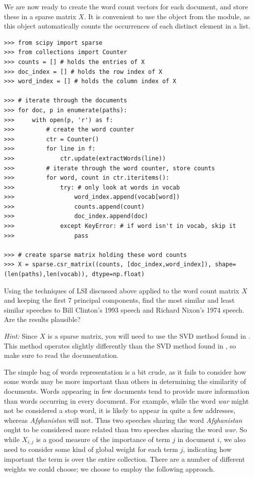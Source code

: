 We are now ready to create the word count vectors for each document, and store these in a sparse matrix $X$.
It is convenient to use the  object from the  module, as this
object automatically counts the occurrences of each distinct element in a list. 
\begin{lstlisting}
>>> from scipy import sparse
>>> from collections import Counter
>>> counts = [] # holds the entries of X
>>> doc_index = [] # holds the row index of X
>>> word_index = [] # holds the column index of X

>>> # iterate through the documents
>>> for doc, p in enumerate(paths):
>>>     with open(p, 'r') as f:
>>>         # create the word counter
>>>         ctr = Counter()
>>>         for line in f:
>>>             ctr.update(extractWords(line))
>>>         # iterate through the word counter, store counts
>>>         for word, count in ctr.iteritems():
>>>             try: # only look at words in vocab
>>>                 word_index.append(vocab[word])
>>>                 counts.append(count)
>>>                 doc_index.append(doc)
>>>             except KeyError: # if word isn't in vocab, skip it
>>>                 pass

>>> # create sparse matrix holding these word counts
>>> X = sparse.csr_matrix((counts, [doc_index,word_index]), shape=(len(paths),len(vocab)), dtype=np.float)
\end{lstlisting}

\begin{problem}
Using the techniques of LSI discussed above applied to the word count matrix $X$ and keeping the first 7 principal components,
find the most similar and least similar speeches to Bill Clinton's 1993 speech and Richard Nixon's 1974 speech.
Are the results plausible?

\emph{Hint:} Since $X$ is a sparse matrix, you will need to use the SVD method found in . 
This method operates slightly differently than the SVD method found in , so make sure to read the 
documentation.
\label{prob:LSI1}
\end{problem}

The simple bag of words representation is a bit crude, as it fails to consider how some words may be more important than others
in determining the similarity of documents.
Words appearing in few documents tend
to provide more information than words occurring in every document.
For example, while the word \emph{war} might not be considered a stop word,
it is likely to appear in quite a few addresses, whereas \emph{Afghanistan} will not.
Thus two speeches sharing the word \emph{Afghanistan} ought to be considered more
related than two speeches sharing the word \emph{war}.
So while $X_{i,j}$ is a good measure of the importance of term $j$ in document $i$,
we also need to consider some kind of global weight for each term $j$,
indicating how important the term is over the entire collection.
There are a number of different weights we could choose; we choose to employ
the following approach.

